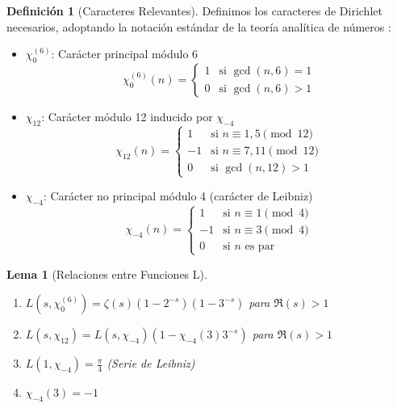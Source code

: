 \documentclass[12pt, a4paper]{article}
\theoremstyle{plain}
\newtheorem{lema}[teorema]{Lema}
\theoremstyle{definition}
\newtheorem{definicion}[teorema]{Definición}
\begin{document}
\begin{definicion}[Caracteres Relevantes]
Definimos los caracteres de Dirichlet necesarios, adoptando la notación estándar de la teoría analítica de números \cite{apostol1976, davenport2000, iwaniec2004}:
\begin{itemize}
    \item $\chi_0^{(6)}$: Carácter principal módulo 6
    \[
    \chi_0^{(6)}(n) = \begin{cases} 
    1 & \text{si } \gcd(n,6)=1 \\
    0 & \text{si } \gcd(n,6)>1 
    \end{cases}
    \]
    
    \item $\chi_{12}$: Carácter módulo 12 inducido por $\chi_{-4}$
    \[
    \chi_{12}(n) = \begin{cases}
    1 & \text{si } n \equiv 1, 5 \pmod{12} \\
    -1 & \text{si } n \equiv 7, 11 \pmod{12} \\
    0 & \text{si } \gcd(n,12)>1
    \end{cases}
    \]
    
    \item $\chi_{-4}$: Carácter no principal módulo 4 (carácter de Leibniz)
    \[
    \chi_{-4}(n) = \begin{cases}
    1 & \text{si } n \equiv 1 \pmod{4} \\
    -1 & \text{si } n \equiv 3 \pmod{4} \\
    0 & \text{si } n \text{ es par}
    \end{cases}
    \]
\end{itemize}
\end{definicion}

\begin{lema}[Relaciones entre Funciones L]
\label{lem:relaciones_L}
\begin{enumerate}
    \item $L(s,\chi_0^{(6)}) = \zeta(s)(1-2^{-s})(1-3^{-s})$ para $\Re(s) > 1$
    
    \item $L(s,\chi_{12}) = L(s,\chi_{-4})(1 - \chi_{-4}(3)3^{-s})$ para $\Re(s) > 1$
    
    \item $L(1,\chi_{-4}) = \frac{\pi}{4}$ (Serie de Leibniz)
    
    \item $\chi_{-4}(3) = -1$
\end{enumerate}
\end{lema}
\end{document}

